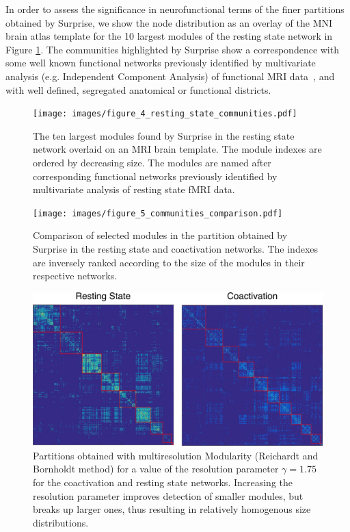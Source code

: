 In order to assess the significance in neurofunctional terms of the finer partitions obtained by Surprise, we show the node distribution as an overlay of the MNI brain atlas template for the 10 largest modules of the resting state network in Figure \ref{fig:figure_4_resting_state_communities}. The communities highlighted by Surprise show a correspondence with some well known functional networks previously identified by multivariate analysis (e.g. Independent Component Analysis) of functional MRI data~\cite{raichle2001,salvador2005,damoiseaux2006,deluca2006}, and with well defined, segregated anatomical or functional districts.

\begin{figure}[htb!]
\centering
\texttt{[image: images/figure\_4\_resting\_state\_communities.pdf]}
\caption{The ten largest modules found by Surprise in the resting state network overlaid on an MRI brain template. The module indexes are ordered by decreasing size. The modules are named after corresponding functional networks previously identified by multivariate analysis of resting state fMRI data.}
\label{fig:figure_4_resting_state_communities}
\end{figure}

\begin{figure}[htb!]
\centering
\texttt{[image: images/figure\_5\_communities\_comparison.pdf]}
\caption{Comparison of selected modules in the partition obtained by Surprise in the resting state and coactivation networks. The indexes are inversely ranked according to the size of the modules in their respective networks.}
\label{fig:figure_5_communities_comparison}
\end{figure}

\begin{figure}[htb!]
\centering
\includegraphics[width=1\linewidth]{images/coact_rs_gamma_1_75.png}
\caption{Partitions obtained with multiresolution Modularity (Reichardt and Bornholdt method) for a value of the resolution parameter $\gamma=1.75$ for the coactivation and resting state networks. Increasing the resolution parameter improves detection of smaller modules, but breaks up larger ones, thus resulting in relatively homogenous size distributions.}
\label{fig:figure_11_gamma_1_75_rs_coact}
\end{figure}

